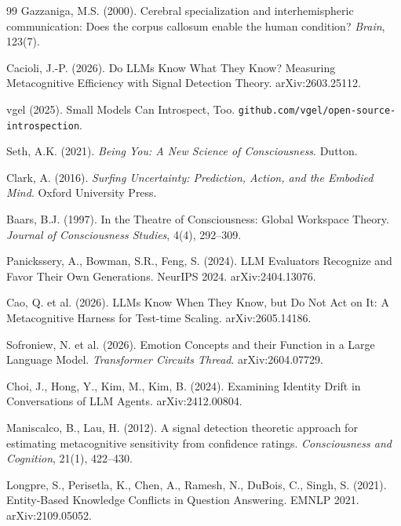 \documentclass[11pt]{article}
\begin{document}
\begin{thebibliography}{99}
Gazzaniga, M.S. (2000).
Cerebral specialization and interhemispheric communication: Does the
corpus callosum enable the human condition? \emph{Brain}, 123(7).

Cacioli, J.-P. (2026).
Do LLMs Know What They Know? Measuring Metacognitive Efficiency with
Signal Detection Theory. arXiv:2603.25112.

vgel (2025).
Small Models Can Introspect, Too.
\texttt{github.com/\allowbreak{}vgel/\allowbreak{}open-\allowbreak{}source-\allowbreak{}introspection}.

Seth, A.K. (2021).
\emph{Being You: A New Science of Consciousness}. Dutton.

Clark, A. (2016).
\emph{Surfing Uncertainty: Prediction, Action, and the Embodied Mind}.
Oxford University Press.

Baars, B.J. (1997).
In the Theatre of Consciousness: Global Workspace Theory.
\emph{Journal of Consciousness Studies}, 4(4), 292--309.

Panickssery, A., Bowman, S.R., Feng, S. (2024).
LLM Evaluators Recognize and Favor Their Own Generations.
NeurIPS 2024. arXiv:2404.13076.

Cao, Q. et al. (2026).
LLMs Know When They Know, but Do Not Act on It: A Metacognitive Harness
for Test-time Scaling. arXiv:2605.14186.

Sofroniew, N. et al. (2026).
Emotion Concepts and their Function in a Large Language Model.
\emph{Transformer Circuits Thread}. arXiv:2604.07729.

Choi, J., Hong, Y., Kim, M., Kim, B. (2024).
Examining Identity Drift in Conversations of LLM Agents. arXiv:2412.00804.

Maniscalco, B., Lau, H. (2012).
A signal detection theoretic approach for estimating metacognitive
sensitivity from confidence ratings. \emph{Consciousness and Cognition},
21(1), 422--430.

Longpre, S., Perisetla, K., Chen, A., Ramesh, N., DuBois, C., Singh, S. (2021).
Entity-Based Knowledge Conflicts in Question Answering. EMNLP 2021.
arXiv:2109.05052.


\end{thebibliography}
\end{document}
